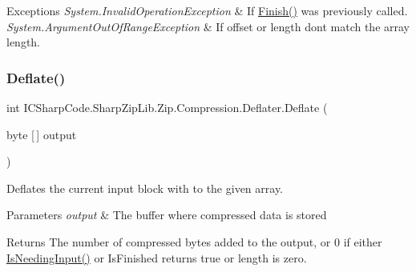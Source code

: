 \begin{DoxyExceptions}{Exceptions}
{\em System.\+Invalid\+Operation\+Exception} & If \hyperlink{class_i_c_sharp_code_1_1_sharp_zip_lib_1_1_zip_1_1_compression_1_1_deflater_a4a1b79d68b91057d4044d1d657b81f6c}{Finish()} was previously called. \\
\hline
{\em System.\+Argument\+Out\+Of\+Range\+Exception} & If offset or length don\textquotesingle{}t match the array length. \\
\hline
\end{DoxyExceptions}
\mbox{\label{class_i_c_sharp_code_1_1_sharp_zip_lib_1_1_zip_1_1_compression_1_1_deflater_a68958680d1f6cdaef83e705908e5c082}} 
\subsubsection{\texorpdfstring{Deflate()}{Deflate()}\hspace{0.1cm}{\footnotesize\ttfamily [3/4]}}
{\footnotesize\ttfamily int I\+C\+Sharp\+Code.\+Sharp\+Zip\+Lib.\+Zip.\+Compression.\+Deflater.\+Deflate (\begin{DoxyParamCaption}\item[{byte \mbox{[}$\,$\mbox{]}}]{output }\end{DoxyParamCaption})\hspace{0.3cm}{\ttfamily [inline]}}



Deflates the current input block with to the given array. 


\begin{DoxyParams}{Parameters}
{\em output} & The buffer where compressed data is stored \\
\hline
\end{DoxyParams}
\begin{DoxyReturn}{Returns}
The number of compressed bytes added to the output, or 0 if either \hyperlink{class_i_c_sharp_code_1_1_sharp_zip_lib_1_1_zip_1_1_compression_1_1_deflater_aab8aa7baaad840eb260ff1e0385fe116}{Is\+Needing\+Input()} or Is\+Finished returns true or length is zero. 
\end{DoxyReturn}
\mbox{\label{class_i_c_sharp_code_1_1_sharp_zip_lib_1_1_zip_1_1_compression_1_1_deflater_a1611ccb20064abb42667e5cbf7b98c4a}} 
